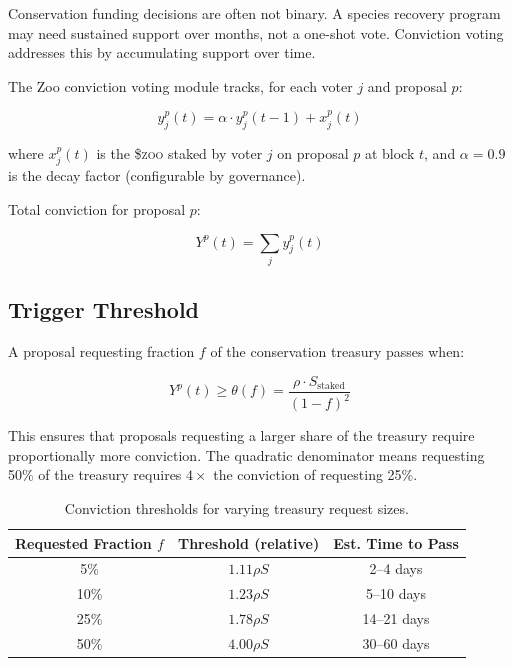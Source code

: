 \documentclass[11pt,letterpaper]{article}
\newcommand{\ZOO}{\$\textsc{zoo}}
\begin{document}
Conservation funding decisions are often not binary. A species recovery program may need sustained support over months, not a one-shot vote. Conviction voting addresses this by accumulating support over time.

The Zoo conviction voting module tracks, for each voter $j$ and proposal $p$:

\begin{equation}
y_j^p(t) = \alpha \cdot y_j^p(t-1) + x_j^p(t)
\end{equation}

where $x_j^p(t)$ is the \ZOO{} staked by voter $j$ on proposal $p$ at block $t$, and $\alpha = 0.9$ is the decay factor (configurable by governance).

Total conviction for proposal $p$:

\begin{equation}
Y^p(t) = \sum_{j} y_j^p(t)
\end{equation}

\subsection{Trigger Threshold}

A proposal requesting fraction $f$ of the conservation treasury passes when:

\begin{equation}
Y^p(t) \geq \theta(f) = \frac{\rho \cdot S_{\text{staked}}}{(1-f)^2}
\end{equation}

This ensures that proposals requesting a larger share of the treasury require proportionally more conviction. The quadratic denominator means requesting 50\% of the treasury requires $4\times$ the conviction of requesting 25\%.

\begin{table}[t]
\centering
\begin{tabular}{ccc}
\toprule
\textbf{Requested Fraction $f$} & \textbf{Threshold (relative)} & \textbf{Est. Time to Pass} \\
\midrule
5\% & $1.11\rho S$ & 2--4 days \\
10\% & $1.23\rho S$ & 5--10 days \\
25\% & $1.78\rho S$ & 14--21 days \\
50\% & $4.00\rho S$ & 30--60 days \\
\bottomrule
\end{tabular}
\caption{Conviction thresholds for varying treasury request sizes.}
\label{tab:conviction}
\end{table}
\end{document}
